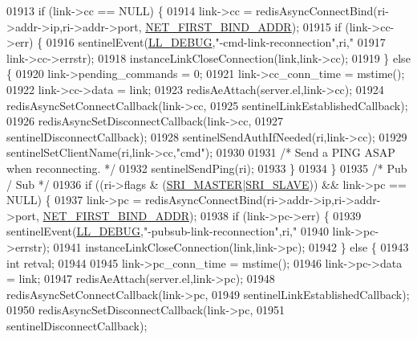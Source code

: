 \begin{DoxyCode}
{{{{{{{{{{{{{{{{{{{{{{{{{{{{{{{{{{{{01913     \textcolor{keywordflow}{if} (link->cc == NULL) \{
01914         link->cc = redisAsyncConnectBind(ri->addr->ip,ri->addr->port,
      \hyperlink{server_8h_a53b900c09238a4ff78e0af9574335dfd}{NET\_FIRST\_BIND\_ADDR});
01915         \textcolor{keywordflow}{if} (link->cc->err) \{
01916             sentinelEvent(\hyperlink{server_8h_abcaffe365dee628fcf9fc90c69d534a1}{LL\_DEBUG},\textcolor{stringliteral}{"-cmd-link-reconnection"},ri,\textcolor{stringliteral}{"%
01917                 link->cc->errstr);
01918             instanceLinkCloseConnection(link,link->cc);
01919         \} \textcolor{keywordflow}{else} \{
01920             link->pending\_commands = 0;
01921             link->cc\_conn\_time = mstime();
01922             link->cc->data = link;
01923             redisAeAttach(server.el,link->cc);
01924             redisAsyncSetConnectCallback(link->cc,
01925                     sentinelLinkEstablishedCallback);
01926             redisAsyncSetDisconnectCallback(link->cc,
01927                     sentinelDisconnectCallback);
01928             sentinelSendAuthIfNeeded(ri,link->cc);
01929             sentinelSetClientName(ri,link->cc,\textcolor{stringliteral}{"cmd"});
01930 
01931             \textcolor{comment}{/* Send a PING ASAP when reconnecting. */}
01932             sentinelSendPing(ri);
01933         \}
01934     \}
01935     \textcolor{comment}{/* Pub / Sub */}
01936     \textcolor{keywordflow}{if} ((ri->flags & (\hyperlink{sentinel_8c_a2ee83e5ff67b45746cd6a310f15334b2}{SRI\_MASTER}|\hyperlink{sentinel_8c_a4b9db21eda79d49bd9fdf2cf7b3178e8}{SRI\_SLAVE})) && link->pc == NULL) \{
01937         link->pc = redisAsyncConnectBind(ri->addr->ip,ri->addr->port,
      \hyperlink{server_8h_a53b900c09238a4ff78e0af9574335dfd}{NET\_FIRST\_BIND\_ADDR});
01938         \textcolor{keywordflow}{if} (link->pc->err) \{
01939             sentinelEvent(\hyperlink{server_8h_abcaffe365dee628fcf9fc90c69d534a1}{LL\_DEBUG},\textcolor{stringliteral}{"-pubsub-link-reconnection"},ri,\textcolor{stringliteral}{"%
01940                 link->pc->errstr);
01941             instanceLinkCloseConnection(link,link->pc);
01942         \} \textcolor{keywordflow}{else} \{
01943             \textcolor{keywordtype}{int} retval;
01944 
01945             link->pc\_conn\_time = mstime();
01946             link->pc->data = link;
01947             redisAeAttach(server.el,link->pc);
01948             redisAsyncSetConnectCallback(link->pc,
01949                     sentinelLinkEstablishedCallback);
01950             redisAsyncSetDisconnectCallback(link->pc,
01951                     sentinelDisconnectCallback);
}}}}}}}}}}}}}}}}}}}}}}}}}}}}}}}}}}}}}}
\end{DoxyCode}
